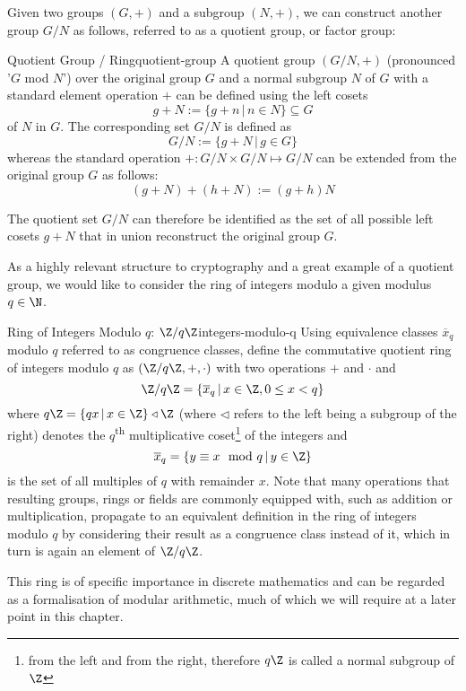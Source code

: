 Given two groups $(G, +)$ and a subgroup $(N, +)$, we can construct another group $G / N$ as follows, referred to as a quotient group, or factor group:

\begin{definition}{Quotient Group / Ring}{quotient-group}
  A quotient group $(G / N, +)$ (pronounced '$G$ mod $N$') over the original group $G$ and a normal subgroup $N$ of $G$
  with a standard element operation $+$ can be defined using the left cosets
  $$g+N := \{g+n \,|\, n \in N\} \subseteq G$$ of $N$ in $G$.
  The corresponding set $G / N$ is defined as
  $$G / N := \{g + N \,|\, g \in G\}$$
  whereas the standard operation $+: G/N \times G/N \mapsto G/N$
  can be extended from the original group $G$ as follows:
  $$(g+N) + (h+N) := (g+h)N$$
\end{definition}

The quotient set $G / N$ can therefore be identified as the set of all possible left cosets $g + N$ that in union reconstruct the original group $G$.

As a highly relevant structure to cryptography and a great example of a quotient group, we would like to consider the ring of integers modulo a given modulus $q \in \N$.

\begin{lemma}{Ring of Integers Modulo $q$: $\Z / q \Z$}{integers-modulo-q}
  Using equivalence classes $\overline{x}_q$ modulo $q$ referred to as congruence classes,
  define the commutative quotient ring of integers modulo $q$ as $(\Z / q \Z, +, \cdot)$ with
  two operations $+$ and $\cdot$ and
  $$\Z / q \Z = \{\overline{x}_q \,|\, x \in \Z, 0 \leq x < q\}$$
  where $q \Z = \{q x \,|\, x \in \Z\} \triangleleft \Z$ (where $\triangleleft$ refers to the left being a subgroup of the right) denotes the $q$\textsuperscript{th} multiplicative coset\footnote{
    from the left and from the right, therefore $q \Z$ is called a normal subgroup of $\Z$
  } of the integers and
  $$\overline{x}_q = \{y \equiv x \mod q \,|\, y \in \Z\}$$
  is the set of all multiples of $q$ with remainder $x$.
  Note that many operations that resulting groups, rings or fields are commonly equipped with,
  such as addition or multiplication, propagate to an equivalent definition in the ring of integers modulo $q$
  by considering their result as a congruence class instead of it, which in turn is again an element of $\Z / q \Z$.
\end{lemma}

This ring is of specific importance in discrete mathematics and can be regarded as a formalisation of modular arithmetic, much of which we will require at a later point in this chapter.

